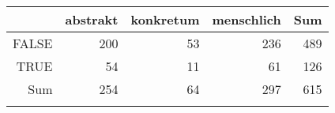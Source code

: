 \begin{tabular}{rrrrr}
  \lsptoprule
 & abstrakt & konkretum & menschlich & Sum \\ 
  \midrule
FALSE & 200 & 53 & 236 & 489 \\ 
  TRUE & 54 & 11 & 61 & 126 \\ 
  Sum & 254 & 64 & 297 & 615 \\ 
   \lspbottomrule
\end{tabular}
